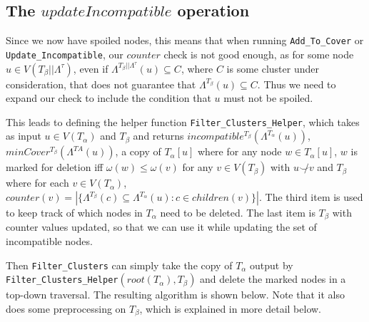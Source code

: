 \documentclass{article}
\newcommand{\compatible}{\smile}
\newcommand{\leafset}{\Lambda}
\newcommand{\weight}{\omega}
\newcommand{\TA}{T_\alpha}
\newcommand{\TB}{T_\beta}
\begin{document}
    \subsection{The $updateIncompatible$ operation}
    \label{subsec:updateincompatible}

    






    Since we now have spoiled nodes, this means that when running \texttt{Add\_To\_Cover} or \texttt{Update\_Incompatible}, our $counter$ check is not good enough, as for some node $u \in V(\TB||\leafset^{\tau})$, even if $\leafset^{\TB||\leafset^{\tau}}(u) \subseteq C$, where $C$ is some cluster under consideration, that does not guarantee that $\leafset^{\TB}(u) \subseteq C$. Thus we need to expand our check to include the condition that $u$ must not be spoiled.

    This leads to defining the helper function \texttt{Filter\_Clusters\_Helper}, which takes as input $u \in V(\TA)$ and $\TB$ and returns $incompatible^{\TB}(\leafset^{\TA}(u))$, $minCover^{\TB}(\leafset^{TA}(u))$, a copy of $\TA[u]$ where for any node $w \in \TA[u]$, $w$ is marked for deletion iff $\weight(w) \leq \weight(v)$ for any $v \in V(\TB)$ with $u \not\compatible v$ and $\TB$ where for each $v \in V(\TA)$, $counter(v) = |\{\leafset^{\TB}(c) \subseteq \leafset^{\TA}(u) : c \in children(v)\}|$. The third item is used to keep track of which nodes in $\TA$ need to be deleted. The last item is $\TB$ with counter values updated, so that we can use it while updating the set of incompatible nodes.

    Then \texttt{Filter\_Clusters} can simply take the copy of $\TA$ output by \texttt{Filter\_Clusters\_Helper}$(root(\TA), \TB)$ and delete the marked nodes in a top-down traversal. The resulting algorithm is shown below. Note that it also does some preprocessing on $\TB$, which is explained in more detail below.
\end{document}
